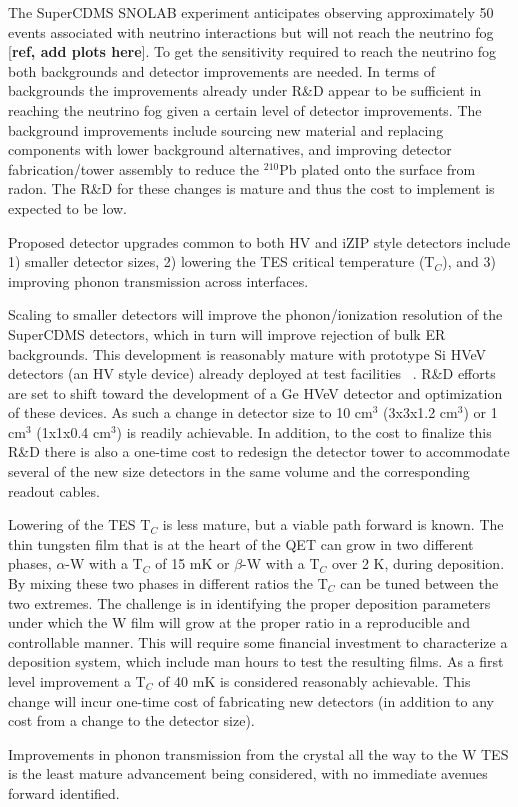 The SuperCDMS SNOLAB experiment anticipates observing approximately 50 events associated with neutrino interactions but will not reach the neutrino fog [\textbf{ref, add plots here}]. To get the sensitivity required to reach the neutrino fog both backgrounds and detector improvements are needed. In terms of backgrounds the improvements already under R\&D appear to be sufficient in reaching the neutrino fog given a certain level of detector improvements. The background improvements include sourcing new material and replacing components with lower background alternatives, and improving detector fabrication/tower assembly to reduce the $^{210}$Pb plated onto the surface from radon. The R\&D for these changes is mature and thus the cost to implement is expected to be low. 

Proposed detector upgrades common to both HV and iZIP style detectors include 1) smaller detector sizes, 2) lowering the TES critical temperature (T$_C$), and 3) improving phonon transmission across interfaces. 

Scaling to smaller detectors will improve the phonon/ionization resolution of the SuperCDMS detectors, which in turn will improve rejection of bulk ER backgrounds. This development is reasonably mature with prototype Si HVeV detectors (an HV style device) already deployed at test facilities ~\cite{SCDMS2019,SCDMS2020}. R\&D efforts are set to shift toward the development of a Ge HVeV detector and optimization of these devices. As such a change in detector size to 10 cm$^3$ (3x3x1.2 cm$^3$) or 1 cm$^3$ (1x1x0.4 cm$^3$) is readily achievable. In addition, to the cost to finalize this R\&D there is also a one-time cost to redesign the detector tower to accommodate several of the new size detectors in the same volume and the corresponding readout cables.

Lowering of the TES T$_C$ is less mature, but a viable path forward is known. The thin tungsten film that is at the heart of the QET can grow in two different phases, $\alpha$-W with a T$_C$ of 15 mK or $\beta$-W with a T$_C$ over 2 K, during deposition. By mixing these two phases in different ratios the T$_C$ can be tuned between the two extremes. The challenge is in identifying the proper deposition parameters under which the W film will grow at the proper ratio in a reproducible and controllable manner. This will require some financial investment to characterize a deposition system, which include man hours to test the resulting films. As a first level improvement a T$_C$ of 40 mK is considered reasonably achievable. This change will incur one-time cost of fabricating new detectors (in addition to any cost from a change to the detector size).

Improvements in phonon transmission from the crystal all the way to the W TES is the least mature advancement being considered, with no immediate avenues forward identified. 

